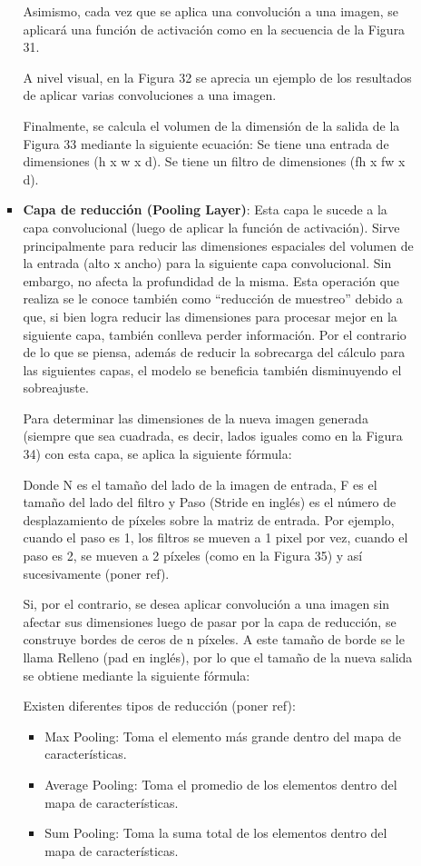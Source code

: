 \begin{itemize}
\begin{itemize}
\begin{itemize}
			Asimismo, cada vez que se aplica una convolución a una imagen, se aplicará una función de activación como en la secuencia de la Figura 31.
			
			A nivel visual, en la Figura 32 se aprecia un ejemplo de los resultados de aplicar varias convoluciones a una imagen.
			
			Finalmente, se calcula el volumen de la dimensión de la salida de la Figura 33 mediante la siguiente ecuación:
			Se tiene una entrada de dimensiones (h x w x d).
			Se tiene un filtro de dimensiones (fh  x fw  x d).
			\item \textbf{Capa de reducción (Pooling Layer)}: Esta capa le sucede a la capa convolucional (luego de aplicar la función de activación). Sirve principalmente para reducir las dimensiones espaciales del volumen de la entrada (alto x ancho) para la siguiente capa convolucional. Sin embargo, no afecta la profundidad de la misma. Esta operación que realiza se le conoce también como “reducción de muestreo” debido a que, si bien logra reducir las dimensiones para procesar mejor en la siguiente capa, también conlleva perder información. Por el contrario de lo que se piensa, además de reducir la sobrecarga del cálculo para las siguientes capas, el modelo se beneficia también disminuyendo el sobreajuste.
			
			Para determinar las dimensiones de la nueva imagen generada (siempre que sea cuadrada, es decir, lados iguales como en la Figura 34) con esta capa, se aplica la siguiente fórmula:
			
			Donde N es el tamaño del lado de la imagen de entrada, F es el tamaño del lado del filtro y Paso (Stride en inglés) es el número de desplazamiento de píxeles sobre la matriz de entrada. Por ejemplo, cuando el paso es 1, los filtros se mueven a 1 pixel por vez, cuando el paso es 2, se mueven a 2 píxeles (como en la Figura 35) y así sucesivamente (poner ref).
			
			Si, por el contrario, se desea aplicar convolución a una imagen sin afectar sus dimensiones luego de pasar por la capa de reducción, se construye bordes de ceros de n píxeles. A este tamaño de borde se le llama Relleno (pad en inglés), por lo que el tamaño de la nueva salida se obtiene mediante la siguiente fórmula:
			
			Existen diferentes tipos de reducción (poner ref):
			\begin{itemize}
				\item Max Pooling: Toma el elemento más grande dentro del mapa de características.
				\item Average Pooling: Toma el promedio de los elementos dentro del mapa de características.
				\item Sum Pooling: Toma la suma total de los elementos dentro del mapa de características.
			\end{itemize}
			

\end{itemize}
\end{itemize}
\end{itemize}
